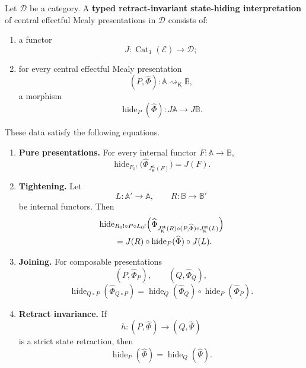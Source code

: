 \begin{definition}
\label{def:retract-invariant-state-hiding-interpretation}
Let \(\mathcal D\) be a category.  A
\textbf{typed retract-invariant state-hiding interpretation} of central
effectful Mealy presentations in \(\mathcal D\) consists of:
\begin{enumerate}
    \item a functor
    \[
        J:\operatorname{Cat}_1(\mathcal E)\longrightarrow\mathcal D;
    \]

    \item for every central effectful Mealy presentation
    \[
        (P,\widehat\Phi):
        \mathbb A\rightsquigarrow_{\mathsf K}\mathbb B,
    \]
    a morphism
    \[
        \operatorname{hide}_P(\widehat\Phi):
        J\mathbb A\longrightarrow J\mathbb B.
    \]
\end{enumerate}
These data satisfy the following equations.

\begin{enumerate}
    \item \textbf{Pure presentations.}
    For every internal functor \(F:\mathbb A\to\mathbb B\),
    \[
        \operatorname{hide}_{F_0!}
        \bigl(
            \widehat\Phi_{J^{\mathrm{st}}_{\mathsf K}(F)}
        \bigr)
        =
        J(F).
    \]

    \item \textbf{Tightening.}
    Let
    \[
        L:\mathbb A'\to\mathbb A,
        \qquad
        R:\mathbb B\to\mathbb B'
    \]
    be internal functors.  Then
    \[
\begin{aligned}
&
\operatorname{hide}_{R_0!\circ P\circ L_0!}
\Bigl(
    \widehat\Phi_{
        J^{\mathrm{st}}_{\mathsf K}(R)
        \circ
        (P,\widehat\Phi)
        \circ
        J^{\mathrm{st}}_{\mathsf K}(L)
    }
\Bigr)
\\
&\qquad=
J(R)
\circ
\operatorname{hide}_P(\widehat\Phi)
\circ
J(L).
\end{aligned}
    \]

    \item \textbf{Joining.}
    For composable presentations
    \[
        (P,\widehat\Phi_P),
        \qquad
        (Q,\widehat\Phi_Q),
    \]
    \[
        \operatorname{hide}_{Q\circ P}
        (\widehat\Phi_{Q\circ P})
        =
        \operatorname{hide}_Q(\widehat\Phi_Q)
        \circ
        \operatorname{hide}_P(\widehat\Phi_P).
    \]

    \item \textbf{Retract invariance.}
    If
    \[
        h:
        (P,\widehat\Phi)
        \longrightarrow
        (Q,\widehat\Psi)
    \]
    is a strict state retraction, then
    \[
        \operatorname{hide}_P(\widehat\Phi)
        =
        \operatorname{hide}_Q(\widehat\Psi).
    \]
\end{enumerate}
\end{definition}


